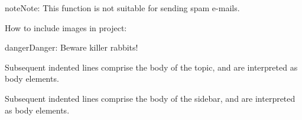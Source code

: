 \documentclass[letterpaper,10pt,english]{sphinxmanual}
\begin{document}
\begin{sphinxadmonition}{note}{Note:}
This function is not suitable for sending spam e-mails.
\end{sphinxadmonition}

How to include images in project:



\begin{productionlist}
\label{\detokenize{usage/directives:grammar-token-try_stmt}}
\label{\detokenize{usage/directives:grammar-token-try1_stmt}}
\label{\detokenize{usage/directives:grammar-token-try2_stmt}}
\end{productionlist}


\begin{sphinxadmonition}{danger}{Danger:}
Beware killer rabbits!
\end{sphinxadmonition}

\begin{sphinxShadowBox}

Subsequent indented lines comprise
the body of the topic, and are
interpreted as body elements.
\end{sphinxShadowBox}

\begin{sphinxShadowBox}

Subsequent indented lines comprise
the body of the sidebar, and are
interpreted as body elements.
\end{sphinxShadowBox}
\end{document}
